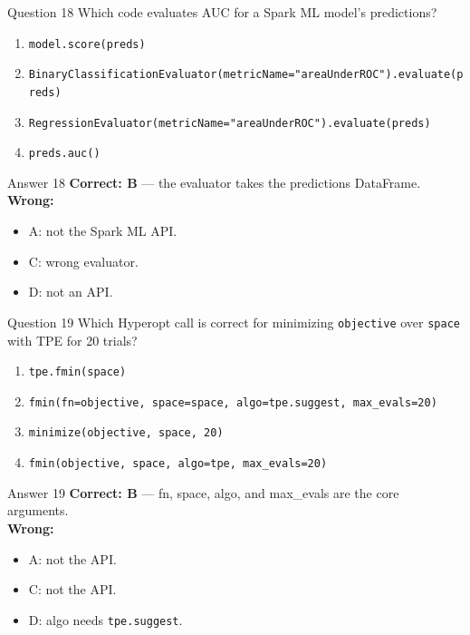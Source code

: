 \documentclass[aspectratio=169,11pt]{beamer}
\begin{document}
\begin{frame}{Question 18}
Which code evaluates AUC for a Spark ML model's predictions?
\begin{enumerate}[label=\Alph*.]
\item \texttt{model.score(preds)}
\item \texttt{BinaryClassificationEvaluator(metricName="areaUnderROC").evaluate(preds)}
\item \texttt{RegressionEvaluator(metricName="areaUnderROC").evaluate(preds)}
\item \texttt{preds.auc()}
\end{enumerate}
\end{frame}
\begin{frame}{Answer 18}
\textbf{Correct: B} --- the evaluator takes the predictions DataFrame.\\
\vspace{0.5em}
\textbf{Wrong:}
\begin{itemize}
\item A: not the Spark ML API.
\item C: wrong evaluator.
\item D: not an API.
\end{itemize}
\end{frame}

\begin{frame}{Question 19}
Which Hyperopt call is correct for minimizing \texttt{objective} over \texttt{space} with TPE for 20 trials?
\begin{enumerate}[label=\Alph*.]
\item \texttt{tpe.fmin(space)}
\item \texttt{fmin(fn=objective, space=space, algo=tpe.suggest, max\_evals=20)}
\item \texttt{minimize(objective, space, 20)}
\item \texttt{fmin(objective, space, algo=tpe, max\_evals=20)}
\end{enumerate}
\end{frame}
\begin{frame}{Answer 19}
\textbf{Correct: B} --- fn, space, algo, and max\_evals are the core arguments.\\
\vspace{0.5em}
\textbf{Wrong:}
\begin{itemize}
\item A: not the API.
\item C: not the API.
\item D: algo needs \texttt{tpe.suggest}.
\end{itemize}
\end{frame}
\end{document}
